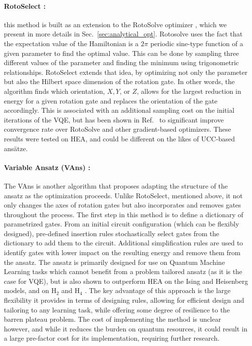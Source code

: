 \paragraph{RotoSelect \cite{ostaszewskiStructureOptimizationParameterized2021}:} this method is built as an extension to the RotoSolve optimizer \cite{Nakaji2021, ostaszewskiStructureOptimizationParameterized2021}, which we present in more details in Sec.~\ref{sec:analytical_opt}. Rotosolve uses the fact that the expectation value of the Hamiltonian is a $2\pi$ periodic sine-type function of a given parameter to find the optimal value. This can be done by sampling three different values of the parameter and finding the minimum using trigonometric relationships. RotoSelect extends that idea, by optimizing not only the parameter but also the Hilbert space dimension of the rotation gate. In other words, the algorithm finds which orientation, $X, Y$, or $Z$, allows for the largest reduction in energy for a given rotation gate and replaces the orientation of the gate accordingly. This is associated with an additional sampling cost on the initial iterations of the VQE, but has been shown in Ref.~\cite{ostaszewskiStructureOptimizationParameterized2021} to significant improve convergence rate over RotoSolve and other gradient-based optimizers. These results were tested on HEA, and could be different on the likes of UCC-based ans\"atze.     

\paragraph{Variable Ansatz (VAns) \cite{Bilkis2021}:} The VAns is another algorithm that proposes adapting the structure of the ansatz as the optimization proceeds. Unlike RotoSelect, mentioned above, it not only changes the axes of rotation gates but also incorporates and removes gates throughout the process. The first step in this method is to define a dictionary of parametrized gates. From an initial circuit configuration (which can be flexibly designed), pre-defined insertion rules stochastically select gates from the dictionary to add them to the circuit. Additional simplification rules are used to identify gates with lower impact on the resulting energy and remove them from the ansatz. The ansatz is primarily designed for use on Quantum Machine Learning tasks which cannot benefit from a problem tailored ansatz (as it is the case for VQE), but is also shown to outperform HEA on the Ising and Heisenberg models, and on $\mathrm{H_2}$ and $\mathrm{H_4}$ \cite{Bilkis2021}. The key advantage of this approach is the large flexibility it provides in terms of designing rules, allowing for efficient design and tailoring to any learning task, while offering some degree of resilience to the barren plateau problem. The cost of implementing the method is unclear however, and while it reduces the burden on quantum resources, it could result in a large pre-factor cost for its implementation, requiring further research. 

